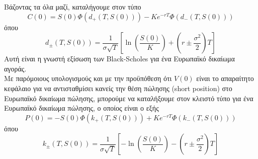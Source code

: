 \documentclass[12pt,a4paper,twoside,openany]{book}
\begin{document}
 	Βάζοντας τα όλα μαζί, καταλήγουμε στον τύπο
 	\[C(0)= S(0) \Phi\left(d_+(T,S(0))\right) - Ke^{-rT}\Phi\left(d_-(T,S(0))\right) \label{OptionCallFormula}\tag{3.2.1}\]
 	όπου 
 	\[d_{\pm}(T,S(0))= \frac{1}{\sigma\sqrt{T}} \left[\ln(\frac{S(0)}{K}) + \left(r\pm\frac{\sigma^2}{2}\right)T \right] \]
 	Αυτή είναι η γνωστή εξίσωση των Black-Scholes για ένα Ευρωπαϊκό δικαίωμα αγοράς.
 	\vspace{2.5mm}\\
 	Με παρόμοιους υπολογισμούς και με την προϋπόθεση ότι $V(0)$ είναι το απαραίτητο κεφάλαιο για να αντισταθμίσει κανείς την θέση πώλησης (short position) στο Ευρωπαϊκό δικαίωμα πώλησης, μπορούμε να καταλήξουμε στον κλειστό τύπο για ένα Ευρωπαϊκό δικαίωμα πώλησης, ο οποίος είναι ο εξής
 	\[P(0)= -S(0) \Phi\left(k_+(T,S(0))\right) + Ke^{-rT}\Phi\left(k_-(T,S(0))\right) \label{OptionPutFormula}\tag{3.2.2} \]
 	όπου
 	\[k_{\pm}(T,S(0))= \frac{1}{\sigma\sqrt{T}} \left[-\ln(\frac{S(0)}{K}) - \left(r\pm\frac{\sigma^2}{2}\right)T \right] \]
 	\endgroup
 	
 	
 	
\end{document}
